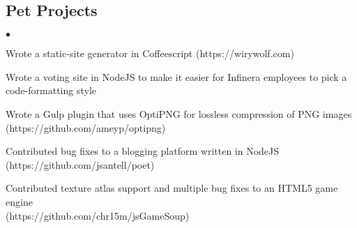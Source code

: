 \documentclass[margin,line]{res}
\newenvironment{list2}{
  \begin{list}{$\bullet$}{%
      \setlength{\itemsep}{0in}
      \setlength{\parsep}{0in} \setlength{\parskip}{0in}
      \setlength{\topsep}{0in} \setlength{\partopsep}{0in}
      \setlength{\leftmargin}{0.2in}}}{\end{list}}
\begin{document}
\begin{resume}
\section{\sc Pet Projects}
\begin{list2}
  \item Wrote a static-site generator in Coffeescript (https://wirywolf.com)
  \item Wrote a voting site in NodeJS to make it easier for Infinera employees to pick a code-formatting style
  \item Wrote a Gulp plugin that uses OptiPNG for lossless compression of PNG images \\ (https://github.com/ameyp/optipng)
  \item Contributed bug fixes to a blogging platform written in NodeJS \- (https://github.com/jsantell/poet)
  \item Contributed texture atlas support and multiple bug fixes to an HTML5 game engine \\ (https://github.com/chr15m/jsGameSoup)
\end{list2}

\end{resume}
\end{document}
